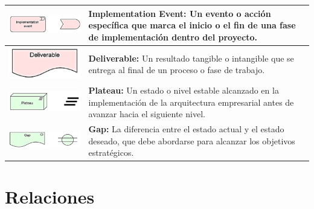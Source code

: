 \begin{longtable}{|c|p{8cm}|}
\hline
\includegraphics{anexos/ARCHI/strategy/event.png} & 
\textbf{Implementation Event:} Un evento o acción específica que marca el inicio o el fin de una fase de implementación dentro del proyecto. \\
\hline
\includegraphics{anexos/ARCHI/strategy/deliverable.png} & 
\textbf{Deliverable:} Un resultado tangible o intangible que se entrega al final de un proceso o fase de trabajo. \\
\hline
\includegraphics{anexos/ARCHI/strategy/plateau.png} & 
\textbf{Plateau:} Un estado o nivel estable alcanzado en la implementación de la arquitectura empresarial antes de avanzar hacia el siguiente nivel. \\
\hline
\includegraphics{anexos/ARCHI/strategy/gap.png} & 
\textbf{Gap:} La diferencia entre el estado actual y el estado deseado, que debe abordarse para alcanzar los objetivos estratégicos. \\
\hline
\end{longtable}

\section{Relaciones}

